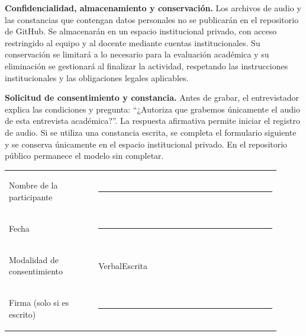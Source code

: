 \noindent\textbf{Confidencialidad, almacenamiento y conservación.} Los archivos de audio y las constancias que contengan datos personales no se publicarán en el repositorio de GitHub. Se almacenarán en un espacio institucional privado, con acceso restringido al equipo y al docente mediante cuentas institucionales. Su conservación se limitará a lo necesario para la evaluación académica y su eliminación se gestionará al finalizar la actividad, respetando las instrucciones institucionales y las obligaciones legales aplicables.

\noindent\textbf{Solicitud de consentimiento y constancia.} Antes de grabar, el entrevistador explica las condiciones y pregunta: ``¿Autoriza que grabemos únicamente el audio de esta entrevista académica?''. La respuesta afirmativa permite iniciar el registro de audio. Si se utiliza una constancia escrita, se completa el formulario siguiente y se conserva únicamente en el espacio institucional privado. En el repositorio público permanece el modelo sin completar.

\vspace{4pt}
\begin{center}
\renewcommand{\arraystretch}{1.85}
\begin{tabular}{@{}>{\bfseries\raggedright\arraybackslash}p{0.30\linewidth}>{\raggedright\arraybackslash}p{0.61\linewidth}@{}}
Nombre de la participante & \rule[-2pt]{0.95\linewidth}{0.4pt} \\
Fecha & \rule[-2pt]{0.95\linewidth}{0.4pt} \\
Modalidad de consentimiento & Verbal\quad \fbox{\rule{0pt}{1.6ex}\rule{1.6ex}{0pt}}\quad Escrita\quad \fbox{\rule{0pt}{1.6ex}\rule{1.6ex}{0pt}} \\
Firma (solo si es escrito) & \rule[-2pt]{0.95\linewidth}{0.4pt} \\
\end{tabular}
\end{center}
\endgroup
